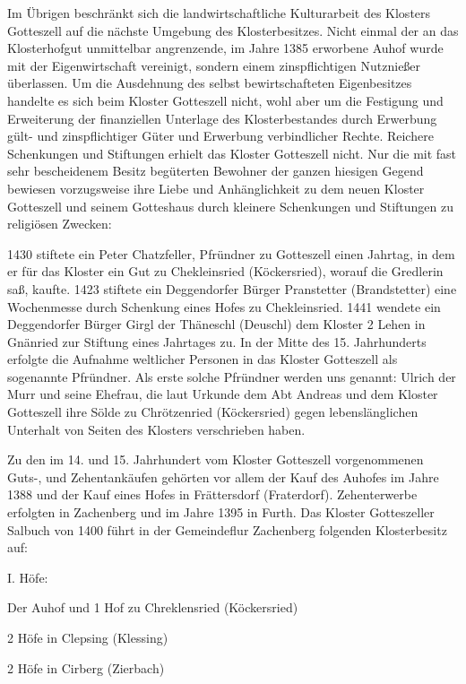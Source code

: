 Im Übrigen beschränkt sich die landwirtschaftliche Kulturarbeit des Klosters
Gotteszell auf die nächste Umgebung des Klosterbesitzes. Nicht einmal der an das
Klosterhofgut unmittelbar angrenzende, im Jahre 1385 erworbene Auhof wurde mit
der Eigenwirtschaft vereinigt, sondern einem zinspflichtigen Nutznießer
überlassen. Um die Ausdehnung des selbst bewirtschafteten Eigenbesitzes handelte
es sich beim Kloster Gotteszell nicht, wohl aber um die Festigung und
Erweiterung der finanziellen Unterlage des Klosterbestandes durch Erwerbung
gült- und zinspflichtiger Güter und Erwerbung verbindlicher Rechte. Reichere
Schenkungen und Stiftungen erhielt das Kloster Gotteszell nicht. Nur die mit
fast sehr bescheidenem Besitz begüterten Bewohner der ganzen hiesigen Gegend
bewiesen vorzugsweise ihre Liebe und Anhänglichkeit zu dem neuen Kloster
Gotteszell und seinem Gotteshaus durch kleinere Schenkungen und Stiftungen zu
religiösen Zwecken:

1430 stiftete ein Peter Chatzfeller, Pfründner zu Gotteszell einen Jahrtag, in
dem er für das Kloster ein Gut zu Chekleinsried (Köckersried), worauf die
Gredlerin saß, kaufte. 1423 stiftete ein Deggendorfer Bürger Pranstetter
(Brandstetter) eine Wochenmesse durch Schenkung eines Hofes zu Chekleinsried.
1441 wendete ein Deggendorfer Bürger Girgl der Thäneschl (Deuschl) dem Kloster 2
Lehen in Gnänried zur Stiftung eines Jahrtages zu. In der Mitte des 15.
Jahrhunderts erfolgte die Aufnahme weltlicher Personen in das Kloster Gotteszell
als sogenannte Pfründner. Als erste solche Pfründner werden uns genannt: Ulrich
der Murr und seine Ehefrau, die laut Urkunde dem Abt Andreas und dem Kloster
Gotteszell ihre Sölde zu Chrötzenried (Köckersried) gegen lebenslänglichen
Unterhalt von Seiten des Klosters verschrieben haben.

Zu den im 14. und 15. Jahrhundert vom Kloster Gotteszell vorgenommenen Guts-,
und Zehentankäufen gehörten vor allem der Kauf des Auhofes im Jahre 1388 und der
Kauf eines Hofes in Frättersdorf (Fraterdorf). Zehenterwerbe erfolgten in
Zachenberg und im Jahre 1395 in Furth. Das Kloster Gotteszeller Salbuch von 1400
führt in der Gemeindeflur Zachenberg folgenden Klosterbesitz auf:



I. Höfe:



Der Auhof und 1 Hof zu Chreklensried (Köckersried)

2 Höfe in Clepsing (Klessing)

2 Höfe in Cirberg (Zierbach)

